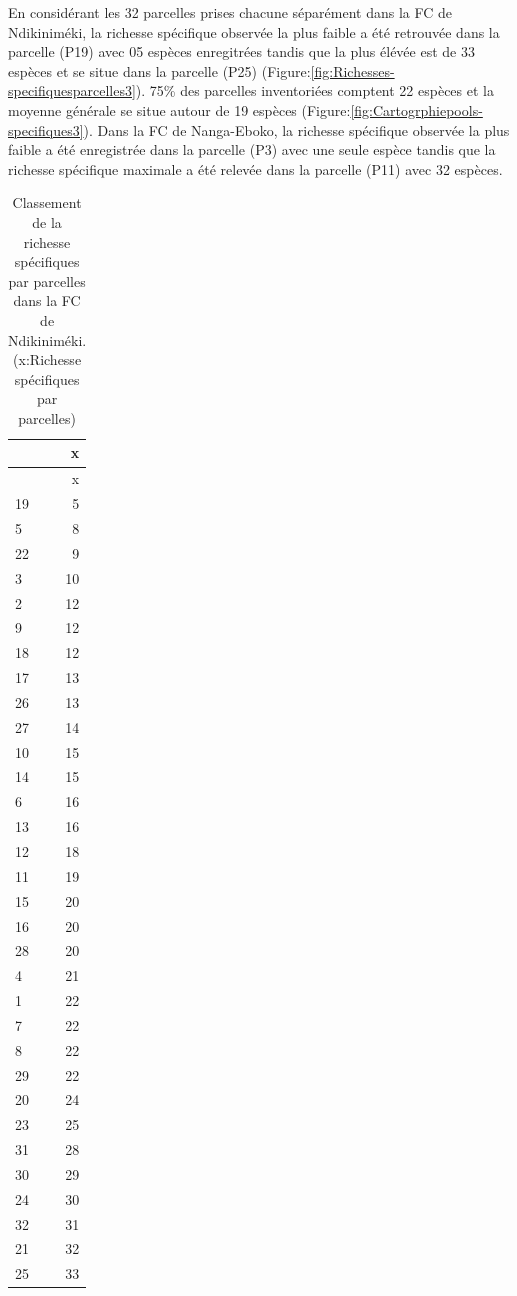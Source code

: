 \documentclass[
  12pt,
  a4paper,
  extrafontsizes,
  onecolumn,
  openright]{book}
\theoremstyle{definition}
\theoremstyle{definition}
\theoremstyle{definition}
\theoremstyle{definition}
\theoremstyle{remark}
\begin{document}
En considérant les 32 parcelles prises chacune séparément dans la FC de Ndikiniméki, la richesse spécifique observée la plus faible a été retrouvée dans la parcelle (P19) avec 05 espèces enregitrées tandis que la plus élévée est de 33 espèces et se situe dans la parcelle (P25) (Figure:\ref{fig:Richesses-specifiquesparcelles3}). 75\% des parcelles inventoriées comptent 22 espèces et la moyenne générale se situe autour de 19 espèces (Figure:\ref{fig:Cartogrphiepools-specifiques3}). Dans la FC de Nanga-Eboko, la richesse spécifique observée la plus faible a été enregistrée dans la parcelle (P3) avec une seule espèce tandis que la richesse spécifique maximale a été relevée dans la parcelle (P11) avec 32 espèces.

\begin{longtable}[]{@{}lr@{}}
\caption{\label{tab:NdikiNombre-especesparcelles3}Classement de la richesse spécifiques par parcelles dans la FC de Ndikiniméki.(x:Richesse spécifiques par parcelles)}\tabularnewline
\toprule()
& x \\
\midrule()
\endfirsthead
\toprule()
& x \\
\midrule()
\endhead
19 & 5 \\
5 & 8 \\
22 & 9 \\
3 & 10 \\
2 & 12 \\
9 & 12 \\
18 & 12 \\
17 & 13 \\
26 & 13 \\
27 & 14 \\
10 & 15 \\
14 & 15 \\
6 & 16 \\
13 & 16 \\
12 & 18 \\
11 & 19 \\
15 & 20 \\
16 & 20 \\
28 & 20 \\
4 & 21 \\
1 & 22 \\
7 & 22 \\
8 & 22 \\
29 & 22 \\
20 & 24 \\
23 & 25 \\
31 & 28 \\
30 & 29 \\
24 & 30 \\
32 & 31 \\
21 & 32 \\
25 & 33 \\
\bottomrule()
\end{longtable}
\end{document}
